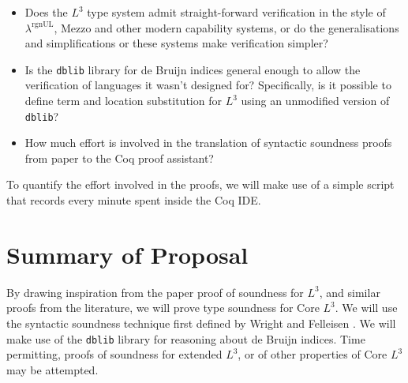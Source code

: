 \documentclass[]{unswthesis}
\newcommand{\rgnUL}{$\lambda^\text{rgnUL}$\text{ }}
\begin{document}
\begin{itemize}
\item Does the $L^3$ type system admit straight-forward verification in the style of \rgnUL, Mezzo and other modern capability systems, or do the generalisations and simplifications or these systems make verification simpler?
\item Is the \texttt{dblib} library for de Bruijn indices general enough to allow the verification of languages it wasn't designed for? Specifically, is it possible to define term and location substitution for $L^3$ using an unmodified version of \texttt{dblib}?
\item How much effort is involved in the translation of syntactic soundness proofs from paper to the Coq proof assistant?
\end{itemize}

To quantify the effort involved in the proofs, we will make use of a simple script that records every minute spent inside the Coq IDE.

\section{Summary of Proposal}

By drawing inspiration from the paper proof of soundness for $L^3$, and similar proofs from the literature, we will prove type soundness for Core $L^3$. We will use the syntactic soundness technique first defined by Wright and Felleisen \cite{wright92}. We will make use of the \texttt{dblib} library \cite{dblib13} for reasoning about de Bruijn indices. Time permitting, proofs of soundness for extended $L^3$, or of other properties of Core $L^3$ may be attempted.

\backmatter


\end{document}
